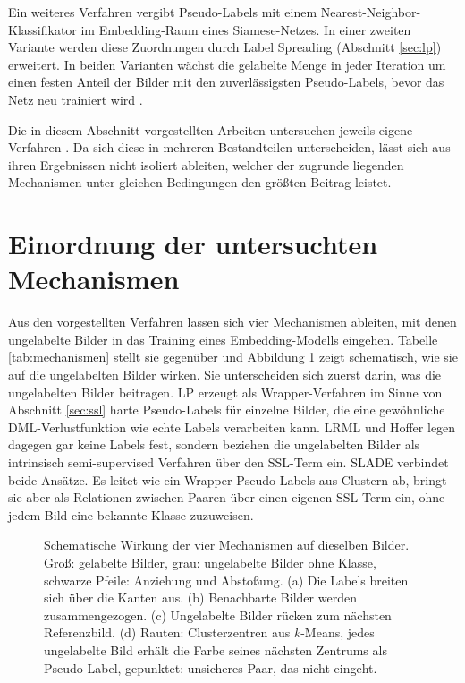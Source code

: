 Ein weiteres Verfahren vergibt Pseudo-Labels mit einem Nearest-Neighbor-Klassifikator im Embedding-Raum eines Siamese-Netzes. In einer zweiten Variante werden diese Zuordnungen durch Label Spreading (Abschnitt \ref{sec:lp}) erweitert. In beiden Varianten wächst die gelabelte Menge in jeder Iteration um einen festen Anteil der Bilder mit den zuverlässigsten Pseudo-Labels, bevor das Netz neu trainiert wird \cite{sahito_semi-supervised_2021}.

Die in diesem Abschnitt vorgestellten Arbeiten untersuchen jeweils eigene Verfahren \cite{dutta_semi-supervised_2021, zhuang_deep_2021, zhuang_deep_2023, duan_slade_2021, kim_self-taught_2022, sahito_semi-supervised_2021}. Da sich diese in mehreren Bestandteilen unterscheiden, lässt sich aus ihren Ergebnissen nicht isoliert ableiten, welcher der zugrunde liegenden Mechanismen unter gleichen Bedingungen den größten Beitrag leistet.

\section{Einordnung der untersuchten Mechanismen}
\label{sec:einordnung}

Aus den vorgestellten Verfahren lassen sich vier Mechanismen ableiten, mit denen ungelabelte Bilder in das Training eines Embedding-Modells eingehen. Tabelle \ref{tab:mechanismen} stellt sie gegenüber und Abbildung \ref{fig:mechanismen} zeigt schematisch, wie sie auf die ungelabelten Bilder wirken. Sie unterscheiden sich zuerst darin, was die ungelabelten Bilder beitragen. \acl{LP} erzeugt als Wrapper-Verfahren im Sinne von Abschnitt \ref{sec:ssl} harte Pseudo-Labels für einzelne Bilder, die eine gewöhnliche \ac{DML}-Verlustfunktion wie echte Labels verarbeiten kann. \ac{LRML} und Hoffer legen dagegen gar keine Labels fest, sondern beziehen die ungelabelten Bilder als intrinsisch semi-supervised Verfahren über den \ac{SSL}-Term ein. \ac{SLADE} verbindet beide Ansätze. Es leitet wie ein Wrapper Pseudo-Labels aus Clustern ab, bringt sie aber als Relationen zwischen Paaren über einen eigenen \ac{SSL}-Term ein, ohne jedem Bild eine bekannte Klasse zuzuweisen.

\begin{figure}[tbp]
  \centering
  
  \caption[Schematische Wirkung der vier untersuchten Mechanismen]{Schematische Wirkung der vier Mechanismen auf dieselben Bilder. Groß: gelabelte Bilder, grau: ungelabelte Bilder ohne Klasse, schwarze Pfeile: Anziehung und Abstoßung. (a) Die Labels breiten sich über die Kanten aus. (b) Benachbarte Bilder werden zusammengezogen. (c) Ungelabelte Bilder rücken zum nächsten Referenzbild. (d) Rauten: Clusterzentren aus $k$-Means, jedes ungelabelte Bild erhält die Farbe seines nächsten Zentrums als Pseudo-Label, gepunktet: unsicheres Paar, das nicht eingeht.}
  \label{fig:mechanismen}
\end{figure}


